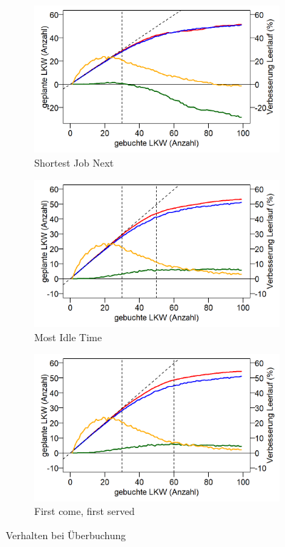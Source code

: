 \begin{figure}[H]
\centering
\begin{subfigure}{.495\textwidth}
  \centering
  \includegraphics[width=\linewidth]{images/graphs/rsOverfillSjn.png}
  \caption{Shortest Job Next}
  \label{fig:eof1}
\end{subfigure}
\begin{subfigure}{.495\textwidth}
  \centering
  \includegraphics[width=\linewidth]{images/graphs/rsOverfillMit.png}
  \caption{Most Idle Time}
  \label{fig:eof2}
\end{subfigure}

\begin{subfigure}{.5\textwidth}
  \centering
  \includegraphics[width=\linewidth]{images/graphs/rsOverfillFcfs.png}
  \caption{First come, first served}
  \label{fig:eof3}
\end{subfigure}
\caption{Verhalten bei Überbuchung}
\label{fig:evalOverfill}
\end{figure}

